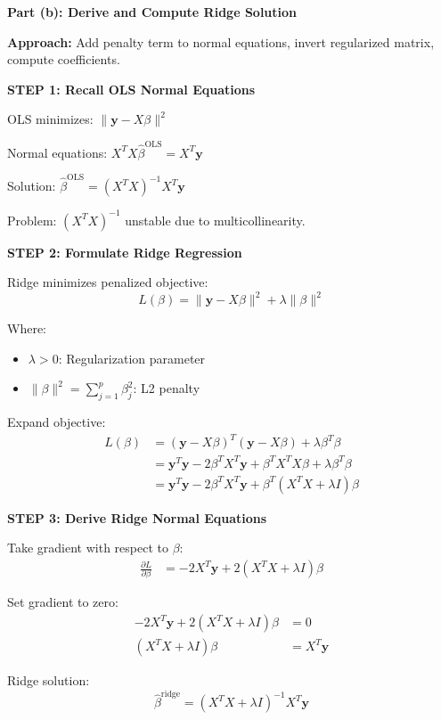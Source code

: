 \documentclass[12pt]{article}
\begin{document}
\begin{solution}

\textbf{Part (b): Derive and Compute Ridge Solution}

\textbf{Approach:} Add penalty term to normal equations, invert regularized matrix, compute coefficients.

\textbf{STEP 1: Recall OLS Normal Equations}

OLS minimizes: $\|\mathbf{y} - X\beta\|^2$

Normal equations: $X^TX\hat{\beta}^{\text{OLS}} = X^T\mathbf{y}$

Solution: $\hat{\beta}^{\text{OLS}} = (X^TX)^{-1}X^T\mathbf{y}$

Problem: $(X^TX)^{-1}$ unstable due to multicollinearity.

\textbf{STEP 2: Formulate Ridge Regression}

Ridge minimizes penalized objective:
\[L(\beta) = \|\mathbf{y} - X\beta\|^2 + \lambda \|\beta\|^2\]

Where:
\begin{itemize}
\item $\lambda > 0$: Regularization parameter
\item $\|\beta\|^2 = \sum_{j=1}^{p} \beta_j^2$: L2 penalty
\end{itemize}

Expand objective:
\begin{align*}
L(\beta) &= (\mathbf{y} - X\beta)^T(\mathbf{y} - X\beta) + \lambda \beta^T\beta \\
&= \mathbf{y}^T\mathbf{y} - 2\beta^TX^T\mathbf{y} + \beta^TX^TX\beta + \lambda\beta^T\beta \\
&= \mathbf{y}^T\mathbf{y} - 2\beta^TX^T\mathbf{y} + \beta^T(X^TX + \lambda I)\beta
\end{align*}

\textbf{STEP 3: Derive Ridge Normal Equations}

Take gradient with respect to $\beta$:
\begin{align*}
\frac{\partial L}{\partial \beta} &= -2X^T\mathbf{y} + 2(X^TX + \lambda I)\beta
\end{align*}

Set gradient to zero:
\begin{align*}
-2X^T\mathbf{y} + 2(X^TX + \lambda I)\beta &= 0 \\
(X^TX + \lambda I)\beta &= X^T\mathbf{y}
\end{align*}

Ridge solution:
\[\hat{\beta}^{\text{ridge}} = (X^TX + \lambda I)^{-1}X^T\mathbf{y}\]


\end{solution}
\end{document}
